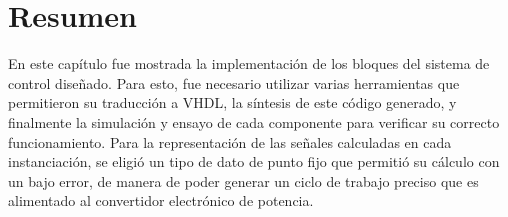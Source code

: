 \section{Resumen}

En este capítulo fue mostrada la implementación de los bloques del sistema de control diseñado. Para esto, fue necesario utilizar varias herramientas que permitieron su traducción a VHDL, la síntesis de este código generado, y finalmente la simulación y ensayo de cada componente para verificar su correcto funcionamiento. Para la representación de las señales calculadas en cada instanciación, se eligió un tipo de dato de punto fijo que permitió su cálculo con un bajo error, de manera de poder generar un ciclo de trabajo preciso que es alimentado al convertidor electrónico de potencia. 

\newpage